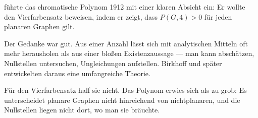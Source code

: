 \begin{geschichte}
 führte das chromatische Polynom 1912 mit einer klaren Absicht ein: Er wollte den Vierfarbensatz beweisen, indem er zeigt, dass $P(G,4) > 0$ für jeden planaren Graphen gilt.

Der Gedanke war gut. Aus einer Anzahl lässt sich mit analytischen Mitteln oft mehr herausholen als aus einer bloßen Existenzaussage --- man kann abschätzen, Nullstellen untersuchen, Ungleichungen aufstellen. Birkhoff und später  entwickelten daraus eine umfangreiche Theorie.

Für den Vierfarbensatz half sie nicht. Das Polynom erwies sich als zu grob: Es unterscheidet planare Graphen nicht hinreichend von nichtplanaren, und die Nullstellen liegen nicht dort, wo man sie bräuchte.

\begin{center}
\begin{minipage}{0.9\textwidth}
\end{minipage}
\end{center}
\end{geschichte}

